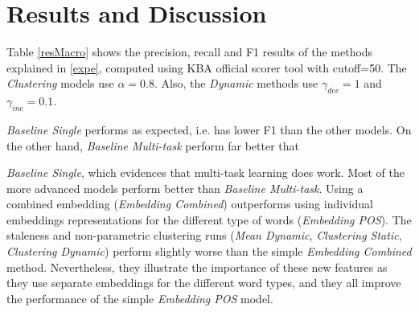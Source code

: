 \documentclass{article}
\newcommand{\todo}[1]{\noindent{\textcolor{red}{\{{\bf TODO:}  #1\}}}}
\begin{document}
\section{Results and Discussion}


Table \ref{resMacro} shows the precision, recall and F1 results of the methods explained in \ref{expe}, computed using KBA official scorer tool with cutoff=50. The \textit{Clustering} models use $\alpha=0.8$. Also, the \textit{Dynamic} methods use $\gamma_{dec}=1$ and $\gamma_{inc}=0.1$.
{\textit{Baseline Single} performs as expected, i.e. has lower F1 than the other models.
On the other hand, {\textit{Baseline Multi-task}} perform far better that {\textit{Baseline Single}, which evidences that multi-task learning does work.
Most of the more advanced models perform better than {\textit{Baseline Multi-task}}. Using a combined embedding ({\textit{Embedding Combined}}) outperforms using individual embeddings representations for the different type of words ({\textit{Embedding POS}}).
The staleness and non-parametric clustering runs ({\textit{Mean Dynamic}}, {\textit{Clustering Static}}, {\textit{Clustering Dynamic}}) perform slightly worse than the simple {\textit{Embedding Combined}} method.
Nevertheless, they illustrate the importance of these new features as they use separate embeddings for the different word types, and they all improve the performance of the simple {\textit{Embedding POS}} model.


}}
\end{document}
